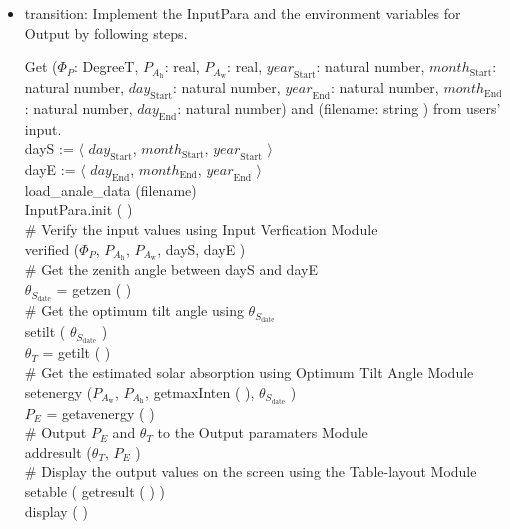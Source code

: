 \documentclass[12pt, titlepage]{article}
\begin{document}
\begin{itemize}
\item transition: Implement the InputPara and  the environment variables for Output by following steps.

Get ($\Phi_P$: DegreeT, $P_{A_{\text{h}}}$: real, $P_{A_{\text{w}}}$: real, $\mathit{year}_\text{Start}$: natural number, $\mathit{month}_\text{Start}$: natural number, $\mathit{day}_\text{Start}$: natural number, $\mathit{year}_\text{End}$: natural number, $\mathit{month}_\text{End}$: natural number, $\mathit{day}_\text{End}$: natural number) and (filename: string ) from users' input.\\

dayS := $\langle$ $\mathit{day}_\text{Start}$, $\mathit{month}_\text{Start}$, $\mathit{year}_\text{Start}$ $\rangle$ \\
dayE :=  $\langle$ $\mathit{day}_\text{End}$, $\mathit{month}_\text{End}$, $\mathit{year}_\text{End}$ $\rangle$ \\

load\_anale\_data (filename)\\
InputPara.init ( )\\

$\#$ Verify the input values using Input Verfication Module\\
verified ($\Phi_P$, $P_{A_{\text{h}}}$, $P_{A_{\text{w}}}$, dayS, dayE )\\

$\#$ Get the zenith angle between dayS and
dayE\\
$\theta_{S_{\text{date}}}$ = getzen ( )\\

$\#$ Get the optimum tilt angle using $\theta_{S_{\text{date}}}$\\
setilt ( $\theta_{S_{\text{date}}}$ )\\
$\theta_{T}$ = getilt ( )\\


$\#$ Get the estimated solar absorption using Optimum Tilt Angle Module\\
setenergy ($P_{A_{\text{w}}}$, $P_{A_{\text{h}}}$, getmaxInten ( ), $\theta_{S_{\text{date}}}$ )\\
$P_{E}$ = getavenergy ( )\\

$\#$ Output $P_{E}$ and $\theta_{T}$ to the Output paramaters Module\\
addresult ($\theta_{T}$, $P_{E}$ )\\

$\#$ Display the output values on the screen using the Table-layout Module\\
setable ( getresult ( ) )\\
display ( )

\end{itemize}
\end{document}
